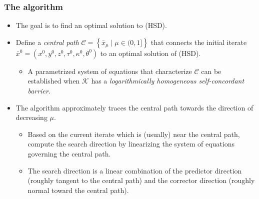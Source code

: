 \documentclass{beamer}
\begin{document}
\begin{frame}
	\frametitle{The algorithm}
	\begin{itemize}
		\item The goal is to find an optimal solution to (HSD).
		\item Define a \textit{central path} $\mathcal{C} = \left\{\bar x_\mu \mid \mu \in (0,1] \right\}$ that connects the initial iterate $\bar x^0 = \left(x^0,y^0,z^0,\tau^0,\kappa^0,\theta^0\right)$ to an optimal solution of (HSD).
		\begin{itemize}
		\item A parametrized system of equations that characterize $\mathcal{C}$ can be established when $\mathcal{K}$ has a \textit{logarithmically homogeneous self-concordant barrier}.
		\end{itemize}
		\item The algorithm approximately traces the central path towards the direction of decreasing $\mu$.
				\begin{itemize}
					\item Based on the current iterate which is (usually) near the central path, compute the search direction by linearizing the system of equations governing the central path.
					\item The search direction is a linear combination of the predictor direction (roughly tangent to the central path) and the corrector direction (roughly normal toward the central path).
				\end{itemize}
	\end{itemize}
\end{frame}
\end{document}
